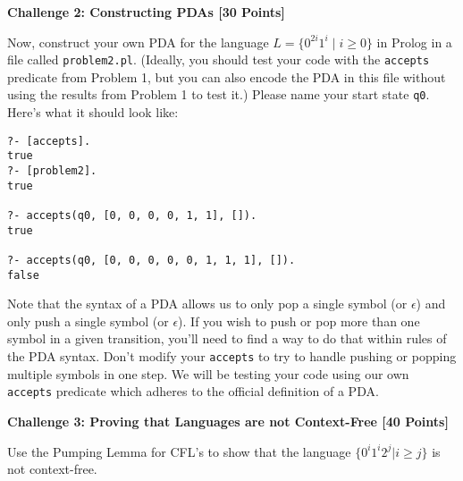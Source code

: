 \documentclass[11pt]{article}
\newcommand{\Problem}[3]{\mbox{} \newline \noindent \textbf{\textbf{Challenge #1: #2 [#3 Points] \\ }}}
\begin{document}
\Problem{2}{Constructing PDAs}{30}

Now, construct your own PDA for the language $L = \{ 0^{2i} 1^{i} \mid i \geq 0 \}$ in Prolog in a file called \verb+problem2.pl+.  (Ideally, you should test your code with the \verb+accepts+ predicate from Problem 1, but you can also encode the PDA in this file without using the results from Problem 1 to test it.)  Please name your start state \verb+q0+.  
Here's what it should look like:
\begin{verbatim}
?- [accepts].
true
?- [problem2].
true

?- accepts(q0, [0, 0, 0, 0, 1, 1], []).
true

?- accepts(q0, [0, 0, 0, 0, 0, 1, 1, 1], []).
false
\end{verbatim}
Note that the syntax of a PDA allows us to only pop a single symbol (or $\epsilon$) and only push a single symbol (or $\epsilon$).  If you wish to push or pop more than one symbol in a given transition, you'll need to find a way to do that within rules of the PDA syntax.  Don't modify your \verb+accepts+ to try to handle pushing or popping multiple symbols in one step.  We will be testing your code using our own \verb+accepts+ predicate which adheres to the official definition of a PDA.

\Problem{3}{Proving that Languages are not Context-Free}{40}

Use the Pumping Lemma for CFL's to show that the 
language $\{0^{i} 1^{i} 2^{j} | i \geq j \}$ is not context-free.  
\end{document}

